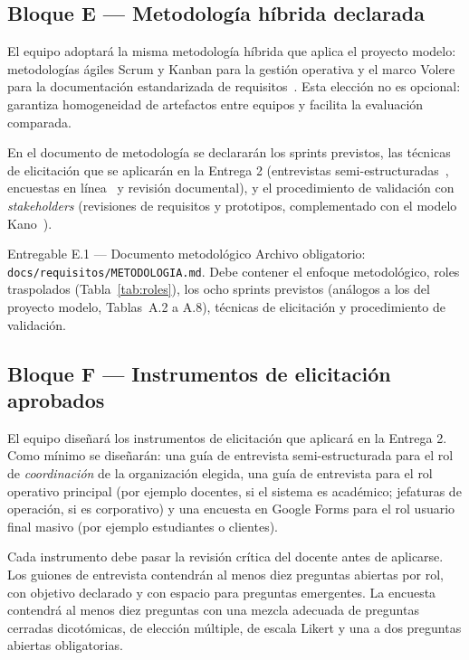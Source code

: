 \documentclass[11pt,a4paper]{article}
\begin{document}
\subsection{Bloque E --- Metodolog\'ia h\'ibrida declarada}

El equipo adoptar\'a la misma metodolog\'ia h\'ibrida que aplica el proyecto modelo: metodolog\'ias \'agiles Scrum y Kanban para la gesti\'on operativa y el marco Volere para la documentaci\'on estandarizada de requisitos~\cite{schwaber2020scrum,kniberg2010kanban,porter2014sentire,robertson2012mastering}. Esta elecci\'on no es opcional: garantiza homogeneidad de artefactos entre equipos y facilita la evaluaci\'on comparada.

En el documento de metodolog\'ia se declarar\'an los sprints previstos, las t\'ecnicas de elicitaci\'on que se aplicar\'an en la Entrega 2 (entrevistas semi-estructuradas~\cite{hove2005interviews}, encuestas en l\'inea~\cite{kitchenham2008surveys} y revisi\'on documental), y el procedimiento de validaci\'on con \emph{stakeholders} (revisiones de requisitos y prototipos, complementado con el modelo Kano~\cite{kano1984attractive,tan2000kano}).

\begin{cajaentregable}{Entregable E.1 --- Documento metodol\'ogico}
Archivo obligatorio: \texttt{docs/requisitos/METODOLOGIA.md}. Debe contener el enfoque metodol\'ogico, roles traspolados (Tabla~\ref{tab:roles}), los ocho sprints previstos (an\'alogos a los del proyecto modelo, Tablas~A.2 a A.8), t\'ecnicas de elicitaci\'on y procedimiento de validaci\'on.
\end{cajaentregable}

\subsection{Bloque F --- Instrumentos de elicitaci\'on aprobados}

El equipo dise\~nar\'a los instrumentos de elicitaci\'on que aplicar\'a en la Entrega 2. Como m\'inimo se dise\~nar\'an: una gu\'ia de entrevista semi-estructurada para el rol de \emph{coordinaci\'on} de la organizaci\'on elegida, una gu\'ia de entrevista para el rol operativo principal (por ejemplo docentes, si el sistema es acad\'emico; jefaturas de operaci\'on, si es corporativo) y una encuesta en Google Forms para el rol usuario final masivo (por ejemplo estudiantes o clientes).

Cada instrumento debe pasar la revisi\'on cr\'itica del docente antes de aplicarse. Los guiones de entrevista contendr\'an al menos diez preguntas abiertas por rol, con objetivo declarado y con espacio para preguntas emergentes. La encuesta contendr\'a al menos diez preguntas con una mezcla adecuada de preguntas cerradas dicot\'omicas, de elecci\'on m\'ultiple, de escala Likert y una a dos preguntas abiertas obligatorias.
\end{document}
